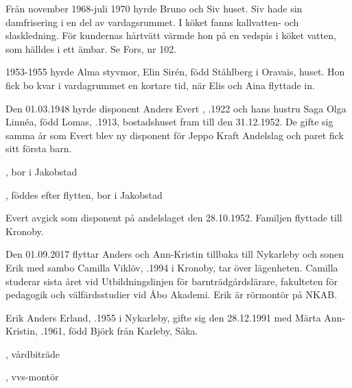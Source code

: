 
Från november 1968-juli 1970 hyrde Bruno och Siv  huset. Siv hade sin damfrisering i en del av vardagsrummet. I köket fanns kallvatten- och slaskledning. För kundernas hårtvätt värmde hon på en	vedspis i köket vatten, som hälldes i ett ämbar. Se Fors, nr 102.

1953-1955 hyrde Alma  styvmor, Elin Sirén, född Ståhlberg i Oravais, huset. Hon fick bo kvar i vardagrummet en kortare tid, när Elis och Aina flyttade in.

Den 01.03.1948 hyrde disponent Anders Evert , .1922 och hans hustru Saga Olga Linnéa, född Lomas, .1913, bostadshuset fram till den 31.12.1952. De gifte sig samma år som Evert blev ny disponent för Jeppo Kraft Andelslag och paret fick sitt första barn.
\begin{jhchildren}
  \item {}, bor i Jakobstad
  \item {}, föddes efter flytten, bor i Jakobstad
\end{jhchildren}
Evert avgick som disponent på andelslaget den 28.10.1952. Familjen flyttade till Kronoby.






Den 01.09.2017 flyttar Anders och Ann-Kristin tillbaka till Nykarleby och sonen Erik med sambo Camilla Viklöv, .1994 i Kronoby, tar över lägenheten. Camilla studerar sista året vid  Utbildningslinjen för barnträdgårdslärare, fakulteten för pedagogik och välfärdsstudier vid Åbo Akademi. Erik är rörmontör på NKAB.


Erik Anders Erland, .1955 i Nykarleby, gifte sig den 28.12.1991 med Märta Ann-Kristin, .1961, född Björk från Karleby, Såka.
\begin{jhchildren}
  \item {}, vårdbiträde
  \item {}, vvs-montör
\end{jhchildren}

